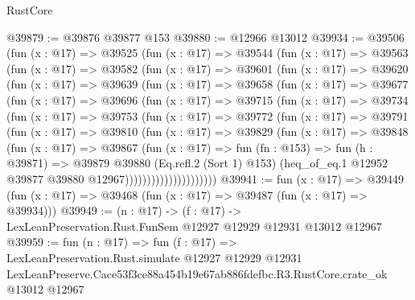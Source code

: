 \begin{lexlean}{RustCore}
\begin{coremodule}
@39879 := @39876 @39877 @153
@39880 := @12966 @13012
@39934 := @39506
    (fun (x : @17) =>
    @39525
      (fun (x : @17) =>
      @39544
        (fun (x : @17) =>
        @39563
          (fun (x : @17) =>
          @39582
            (fun (x : @17) =>
            @39601
              (fun (x : @17) =>
              @39620
                (fun (x : @17) =>
                @39639
                  (fun (x : @17) =>
                  @39658
                    (fun (x : @17) =>
                    @39677
                      (fun (x : @17) =>
                      @39696
                        (fun (x : @17) =>
                        @39715
                          (fun (x : @17) =>
                          @39734
                            (fun (x : @17) =>
                            @39753
                              (fun (x : @17) =>
                              @39772
                                (fun (x : @17) =>
                                @39791
                                  (fun (x : @17) =>
                                  @39810
                                    (fun (x : @17) =>
                                    @39829
                                      (fun (x : @17) =>
                                      @39848
                                        (fun (x : @17) =>
                                        @39867
                                          (fun (x : @17) =>
                                          fun (fn : @153) =>
                                          fun (h : @39871) =>
                                          @39879
                                            @39880
                                            (Eq.refl.{2} (Sort 1) @153)
                                            (heq_of_eq.{1}
                                              @12952
                                              @39877
                                              @39880
                                              @12967)))))))))))))))))))))
@39941 := fun (x : @17) =>
  @39449 (fun (x : @17) => @39468 (fun (x : @17) => @39487 (fun (x : @17) => @39934)))
@39949 := (n : @17) ->
  (f : @17) -> LexLeanPreservation.Rust.FunSem @12927 @12929 @12931 @13012 @12967
@39959 := fun (n : @17) =>
  fun (f : @17) =>
  LexLeanPreservation.Rust.simulate
    @12927
    @12929
    @12931
    LexLeanPreserve.Cace53f3ce88a454b19e67ab886fdefbc.R3.RustCore.crate_ok
    @13012
    @12967
\end{coremodule}
\end{lexlean}

